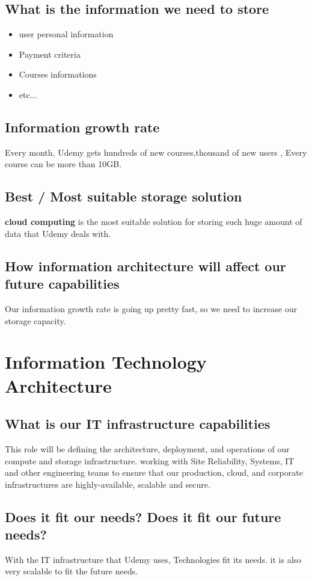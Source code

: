 \documentclass{book}
\begin{document}
\section{What is the information we need to store}
\begin{itemize}
	\item user personal information
	\item Payment criteria
	\item Courses informations
	\item etc...
\end{itemize}
\section{Information growth rate}
Every month, Udemy gets hundreds of new courses,thousand of new users ,
Every course can be more than 10GB. 
\section{Best / Most suitable storage solution}
\textbf{cloud computing} is the most suitable solution for storing such huge amount of data that Udemy deals with.
   


\section{How information architecture will affect our future capabilities}
Our information growth rate is going up pretty fast, so we need to increase our storage capacity.
\chapter{Information Technology Architecture}
\section{What is our IT infrastructure capabilities}
This role will be defining the architecture, deployment, and operations of our compute and storage infrastructure. working with Site Reliability, Systems, IT and other engineering teams to ensure that our production, cloud, and corporate infrastructures are highly-available, scalable and secure.
\section{Does it fit our needs?  Does it fit our future needs?}
With the IT infrastructure that Udemy uses, Technologies fit its needs. it is also very scalable to fit the future needs.
\end{document}
